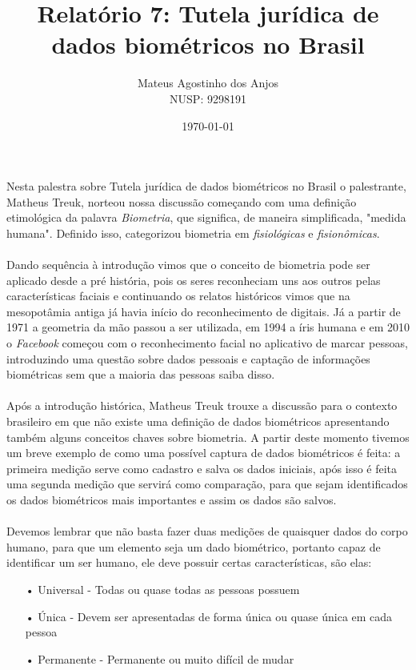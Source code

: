 \documentclass[12pt]{article}
\title{Relatório 7: Tutela jurídica de dados biométricos no Brasil}
\author{Mateus Agostinho dos Anjos\\NUSP: 9298191}
\date{\today}
\begin{document}
	\maketitle
	\paragraph{}
		Nesta palestra sobre Tutela jurídica de dados biométricos no Brasil
		o palestrante, Matheus Treuk, norteou nossa discussão começando com uma
		definição etimológica da palavra \textit{Biometria}, que significa, de maneira 
		simplificada, "medida humana".  Definido isso, categorizou biometria em
		\textit{fisiológicas} e \textit{fisionômicas}.
	\paragraph{}
		Dando sequência à introdução vimos que o conceito de biometria pode ser
		aplicado desde a pré história, pois os seres reconheciam uns aos outros pelas
		características faciais e continuando os relatos históricos vimos que na 
		mesopotâmia antiga já havia início do reconhecimento de digitais. Já a partir de
		1971 a geometria da mão passou a ser utilizada, em 1994 a íris humana e
		em 2010 o \textit{Facebook} começou com o reconhecimento facial no
		aplicativo de marcar pessoas, introduzindo uma questão sobre dados 
		pessoais e captação de informações biométricas sem que a maioria das
		pessoas saiba disso.
	\paragraph{}
		Após a introdução histórica, Matheus Treuk trouxe a discussão para o contexto
		brasileiro em que não existe uma definição de dados biométricos apresentando
		também alguns conceitos chaves sobre biometria. A partir deste momento
		tivemos um breve exemplo de como uma possível captura de dados biométricos
		é feita: a primeira medição serve como cadastro e salva os dados iniciais, após
		isso é feita uma segunda medição que servirá como comparação, para que
		sejam identificados os dados biométricos mais importantes e assim
		os dados são salvos.
	\paragraph{}
		Devemos lembrar que não basta fazer duas medições de quaisquer dados do
		corpo humano, para que um elemento seja um dado biométrico, portanto capaz
		de identificar um ser humano, ele deve possuir certas características, são
		elas:
		\begin{itemize}
			\item[•]
				Universal - Todas ou quase todas as pessoas possuem
			\item[•]
				Única - Devem ser apresentadas de forma única ou quase única em cada
				pessoa
			\item[•]
				Permanente - Permanente ou muito difícil de mudar		
		\end{itemize}			

		
\end{document}
